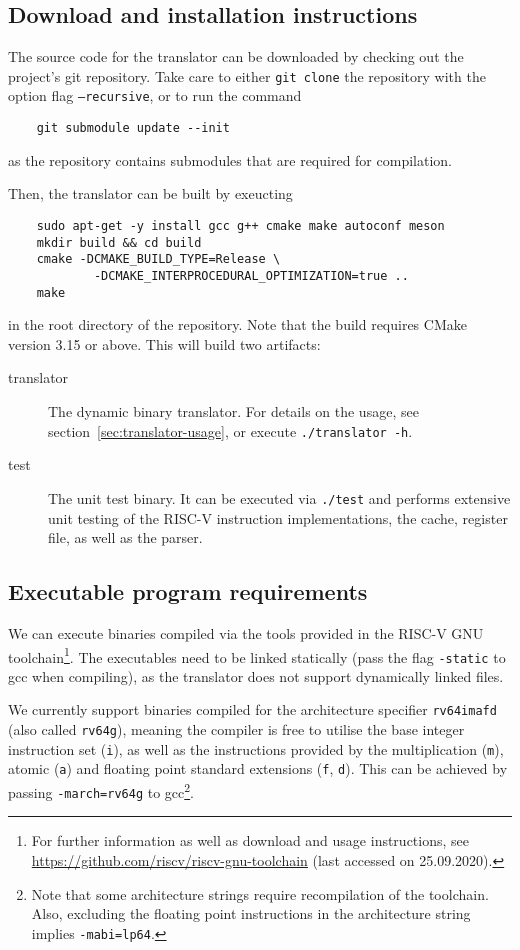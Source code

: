 \subsection{Download and installation instructions}
The source code for the translator can be downloaded by checking out the project's git repository.
Take care to either \texttt{git clone} the repository with the option flag \texttt{--recursive}, or to run the command
\begin{lstlisting}
	git submodule update --init
\end{lstlisting}
as the repository contains submodules that are required for compilation.

Then, the translator can be built by exeucting
\begin{lstlisting}
	sudo apt-get -y install gcc g++ cmake make autoconf meson
	mkdir build && cd build
	cmake -DCMAKE_BUILD_TYPE=Release \
			-DCMAKE_INTERPROCEDURAL_OPTIMIZATION=true ..
	make
\end{lstlisting}
in the root directory of the repository.
Note that the build requires CMake version 3.15 or above.
This will build two artifacts:
\begin{description}
	\item[translator] The dynamic binary translator.
	For details on the usage, see section~\ref{sec:translator-usage}, or execute \texttt{./translator -h}.
	
	\item[test] The unit test binary.
	It can be executed via \texttt{./test} and performs extensive unit testing of the RISC-V instruction implementations, the cache, register file, as well as the parser.
\end{description}

\subsection{Executable program requirements}
We can execute binaries compiled via the tools provided in the RISC-V GNU toolchain\footnote{For further information as well as download and usage instructions, see \url{https://github.com/riscv/riscv-gnu-toolchain} (last accessed on 25.09.2020).}.
The executables need to be linked statically (pass the flag \texttt{-static} to gcc when compiling), as the translator does not support dynamically linked files.

We currently support binaries compiled for the architecture specifier \texttt{rv64imafd} (also called \texttt{rv64g}), meaning the compiler is free to utilise the base integer instruction set (\texttt{i}), as well as the instructions provided by the multiplication (\texttt{m}), atomic (\texttt{a}) and floating point standard extensions (\texttt{f}, \texttt{d}).
This can be achieved by passing \texttt{-march=rv64g} to gcc\footnote{Note that some architecture strings require recompilation of the toolchain. Also, excluding the floating point instructions in the architecture string implies \texttt{-mabi=lp64}.}.


